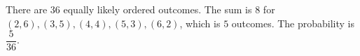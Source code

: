 There are $36$ equally likely ordered outcomes. The sum is $8$ for $(2,6),(3,5),(4,4),(5,3),(6,2)$, which is $5$ outcomes. The probability is $\boxed{\dfrac{5}{36}}$.

